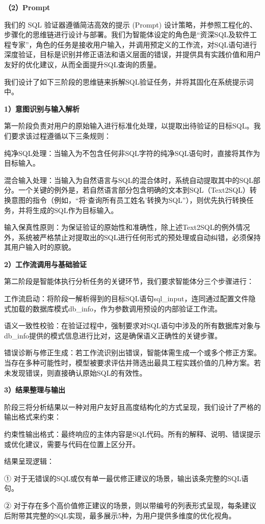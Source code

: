 \begin{CJK*}{UTF8}{song}
\textbf{（2）Prompt}

我们的 SQL 验证器遵循简洁高效的提示 (Prompt) 设计策略，并参照工程化的、步骤化的思维链进行设计与部署。我们为智能体设定的角色是“资深SQL及软件工程专家”，角色的任务是接收用户输入，并调用预定义的工作流，对SQL语句进行深度验证，目标是识别并修正语法和语义层面的错误，并提供具有实践价值和用户友好的优化建议，从而全面提升SQL查询的质量。

我们设计了如下三阶段的思维链来拆解SQL验证任务，并将其固化在系统提示词中。

\textbf{1）意图识别与输入解析}

第一阶段负责对用户的原始输入进行标准化处理，以提取出待验证的目标SQL。我们要求该过程遵循以下三条规则：

纯净SQL处理：当输入为不包含任何非SQL字符的纯净SQL语句时，直接将其作为目标输入。

混合输入处理：当输入为自然语言与SQL的混合体时，系统自动提取其中的SQL部分。一个关键的例外是，若自然语言部分包含明确的文本到SQL（Text2SQL）转换意图的指令（例如，“将‘查询所有员工姓名’转换为SQL”），则优先执行转换任务，并将生成的SQL作为目标输入。

输入保真性原则：为保证验证的原始性和准确性，除上述Text2SQL的例外情况外，系统被严格禁止对提取出的SQL进行任何形式的预处理或自动纠错，必须保持其用户输入时的原貌。

\textbf{2）工作流调用与基础验证}

第二阶段是智能体执行分析任务的关键环节，我们要求智能体分三个步骤进行：

工作流启动：将阶段一解析得到的目标SQL语句sql\_input，连同通过配置文件隐式加载的数据库模式db\_info，作为参数调用预设的内部验证工作流。

语义一致性校验：在验证过程中，强制要求对SQL语句中涉及的所有数据库对象与db\_info提供的模式信息进行比对，这是确保语义正确性的关键步骤。

错误诊断与修正生成：若工作流识别出错误，智能体需生成一个或多个修正方案。当存在多种可能性时，模型被要求评估并筛选出最具工程实践价值的几种方案。若未发现错误，则直接确认原始SQL的有效性。

\textbf{3）结果整理与输出}

阶段三将分析结果以一种对用户友好且高度结构化的方式呈现，我们设计了严格的输出格式来约束：

约束性输出格式：最终响应的主体内容是SQL代码。所有的解释、说明、错误提示或优化建议，需要与代码在位置上区分开。

结果呈现逻辑：

① 对于无错误的SQL或仅有单一最优修正建议的场景，输出该条完整的SQL语句。

② 对于存在多个高价值修正建议的场景，则以带编号的列表形式呈现，每条建议后附带其完整的SQL实现，最多展示5种，为用户提供多维度的优化视角。


\end{CJK*}